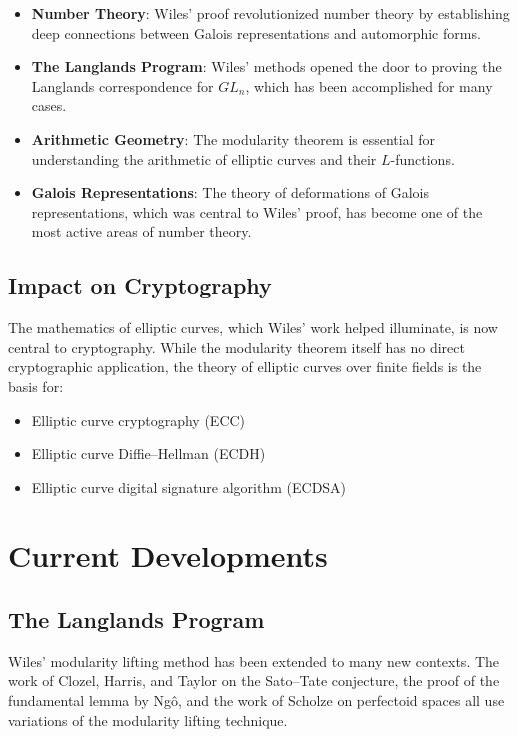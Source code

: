 \begin{itemize}
\item \textbf{Number Theory}: Wiles' proof revolutionized number theory by establishing deep connections between Galois representations and automorphic forms.
\item \textbf{The Langlands Program}: Wiles' methods opened the door to proving the Langlands correspondence for $GL_n$, which has been accomplished for many cases.
\item \textbf{Arithmetic Geometry}: The modularity theorem is essential for understanding the arithmetic of elliptic curves and their $L$-functions.
\item \textbf{Galois Representations}: The theory of deformations of Galois representations, which was central to Wiles' proof, has become one of the most active areas of number theory.
\end{itemize}

\subsection{Impact on Cryptography}

The mathematics of elliptic curves, which Wiles' work helped illuminate, is now central to cryptography. While the modularity theorem itself has no direct cryptographic application, the theory of elliptic curves over finite fields is the basis for:
\begin{itemize}
\item Elliptic curve cryptography (ECC)
\item Elliptic curve Diffie--Hellman (ECDH)
\item Elliptic curve digital signature algorithm (ECDSA)
\end{itemize}

\section{Current Developments}

\subsection{The Langlands Program}

Wiles' modularity lifting method has been extended to many new contexts. The work of Clozel, Harris, and Taylor on the Sato--Tate conjecture, the proof of the fundamental lemma by Ng\^o, and the work of Scholze on perfectoid spaces all use variations of the modularity lifting technique.

